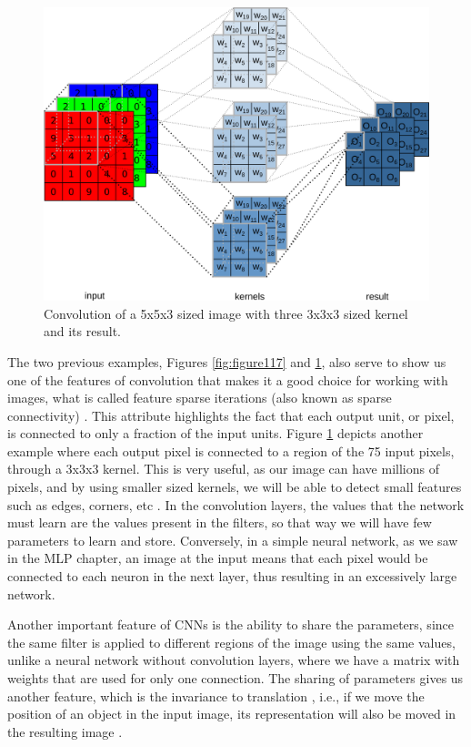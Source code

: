 \begin{figure}
    \centering
    \includegraphics[scale=0.25]{"Part 3 - Learning Systems/Supervised Learning/Deep Learning/images/figure119.png"}
    \caption{Convolution of a 5x5x3 sized image with three 3x3x3 sized kernel and its result.}
    \label{fig:figure119}
\end{figure}

The two previous examples, Figures \ref{fig:figure117} and \ref{fig:figure119}, also serve to show us one of the features of convolution that makes it a good choice for working with images, what is called feature sparse iterations (also known as sparse connectivity) \cite{goodfellow2016}. This attribute highlights the fact that each output unit, or pixel, is connected to only a fraction of the input units. Figure \ref{fig:figure119} depicts another example where each output pixel is connected to a region of the 75 input pixels, through a 3x3x3 kernel. This is very useful, as our image can have millions of pixels, and by using smaller sized kernels, we will be able to detect small features such as edges, corners, etc \cite{goodfellow2016}. In the convolution layers, the values that the network must learn are the values present in the filters, so that way we will have few parameters to learn and store. Conversely, in a simple neural network, as we saw in the MLP chapter, an image at the input means that each pixel would be connected to each neuron in the next layer, thus resulting in an excessively large network.

Another important feature of CNNs is the ability to share the parameters, since the same filter is applied to different regions of the image using the same values, unlike a neural network without convolution layers, where we have a matrix with weights that are used for only one connection. The sharing of parameters gives us another feature, which is the invariance to translation , i.e., if we move the position of an object in the input image, its representation will also be moved in the resulting image \cite{goodfellow2016}.

